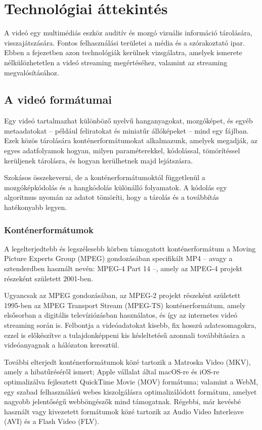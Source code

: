 \chapter{Technológiai áttekintés}

A videó egy multimédiás eszköz auditív és mozgó vizuális információ tárolására, visszajátszására. Fontos felhasználási területei a média és a szórakoztató ipar. Ebben a fejezetben azon technológiák kerülnek vizsgálatra, amelyek ismerete nélkülözhetetlen a videó streaming megértéséhez, valamint az streaming megvalósításához.

\section{A videó formátumai}

Egy videó tartalmazhat különböző nyelvű hanganyagokat, mozgóképet, és egyéb metaadatokat -- például feliratokat és miniatűr állóképeket -- mind egy fájlban. Ezek közös tárolására konténerformátumokat alkalmazunk, amelyek megadják, az egyes adatfolyamok hogyan, milyen paraméterekkel, kódolással, tömörítéssel kerüljenek tárolásra, és hogyan kerülhetnek majd lejátszásra.

Szokásos összekeverni, de a konténerformátumoktól függetlenül a mozgóképkódolás és a hangkódolás különálló folyamatok. A kódolás egy algoritmus nyomán az adatot tömöríti, hogy a tárolás és a továbbítás hatékonyabb legyen.

\subsection{Konténerformátumok}

A legelterjedtebb és legszélesebb körben támogatott konténerformátum a Moving Picture Experts Group (MPEG) gondozásában specifikált MP4 -- avagy a sztenderdben használt nevén: MPEG-4 Part 14 --, amely az MPEG-4 projekt részeként született 2001-ben.

Ugyancsak az MPEG gondozásában, az MPEG-2 projekt részeként született 1995-ben az MPEG Transport Stream (MPEG-TS) konténerformátum, amely elsősorban a digitális televíziózásban használatos, és így az internetes videó streaming során is. Felbontja a videóadatokat kisebb, fix hosszú adatcsomagokra, ezzel is előkészítve a tulajdonképpeni kis késleltetésű azonnali továbbítására a videóanyagnak a hálózaton keresztül.

További elterjedt konténerformátumok közé tartozik a Matroska Video (MKV), amely a hibatűréséről ismert; Apple vállalat által macOS-re és iOS-re optimalizálva fejlesztett QuickTime Movie (MOV) formátuma; valamint a WebM, egy szabad felhasználású webes kiszolgálásra optimalizálódott formátum, amelyet nagyobb jelentőségű webböngészők mind támogatnak. Régebbi, már kevésbé használt vagy kivezetett formátumok közé tartozik az Audio Video Interleave (AVI) és a Flash Video (FLV).

